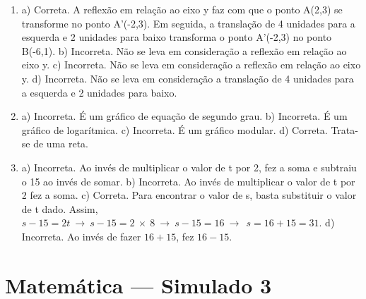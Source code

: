 \begin{enumerate}
\item a) Correta. A reflexão em relação ao eixo y faz com que o ponto
A(2,3) se transforme no ponto A'(-2,3). Em seguida, a translação de 4 unidades para a esquerda e 2 unidades para baixo transforma o ponto A'(-2,3) no ponto B(-6,1).
b) Incorreta. Não se leva em consideração a reflexão em relação ao eixo y.
c) Incorreta. Não se leva em consideração a reflexão em relação ao eixo y.
d) Incorreta. Não se leva em consideração a translação de 4 unidades para a esquerda e 2 unidades para baixo.


\item a) Incorreta. É um gráfico de equação de segundo grau.
b) Incorreta. É um gráfico de logarítmica.
c) Incorreta. É um gráfico modular.
d) Correta. Trata-se de uma reta.


\item a) Incorreta. Ao invés de multiplicar o valor de t por 2, fez a soma e subtraiu o 15 ao invés de somar.
b) Incorreta. Ao invés de multiplicar o valor de t por 2 fez a soma.
c) Correta. Para encontrar o valor de s, basta substituir o valor de t dado. Assim, $s - 15 = 2t\  \rightarrow \ s - 15 = 2\  \times \ 8\  \rightarrow \ s - 15 = 16\  \rightarrow \ \ s = 16 + 15 = 31$.
d) Incorreta. Ao invés de fazer $16 + 15$, fez $16-15$.
\end{enumerate}

\section*{Matemática — Simulado 3} 


